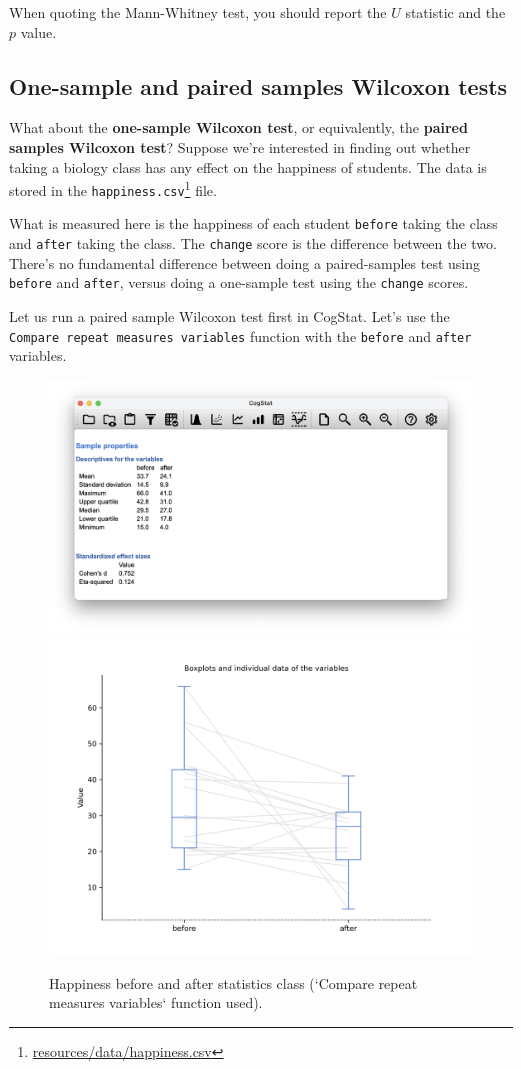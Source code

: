 \documentclass[
  11pt,
  a4paper,
  twoside,symmetric,openright]{book}
\theoremstyle{break}
\theoremstyle{break}
\DeclareRobustCommand{\href}[2]{#2\footnote{\url{#1}}}
\begin{document}
When quoting the Mann-Whitney test, you should report the \(U\) statistic and the \(p\) value.

\subsection{One-sample and paired samples Wilcoxon tests}\label{wilcoxon}

What about the \textbf{one-sample Wilcoxon test}, or equivalently, the \textbf{paired samples Wilcoxon test}? Suppose we're interested in finding out whether taking a biology class has any effect on the happiness of students. The data is stored in the \href{resources/data/happiness.csv}{\texttt{happiness.csv}} file.

What is measured here is the happiness of each student \texttt{before} taking the class and \texttt{after} taking the class. The \texttt{change} score is the difference between the two. There's no fundamental difference between doing a paired-samples test using \texttt{before} and \texttt{after}, versus doing a one-sample test using the \texttt{change} scores.

Let us run a paired sample Wilcoxon test first in CogStat. Let's use the \texttt{Compare\ repeat\ measures\ variables} function with the \texttt{before} and \texttt{after} variables.

\begin{figure}

{\centering \includegraphics[width=0.6\linewidth]{resources/image/cogstathappinessdescr} \includegraphics[width=0.6\linewidth]{resources/image/cogstathappinessbox} 

}

\caption{Happiness before and after statistics class (`Compare repeat measures variables` function used).}\label{fig:mwbeforeafter}
\end{figure}
\end{document}
